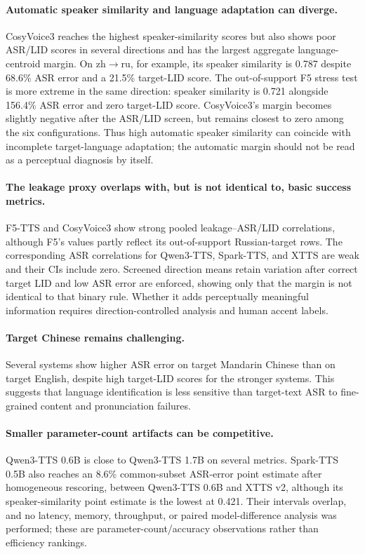 \documentclass[11pt]{article}
\begin{document}
\paragraph{Automatic speaker similarity and language adaptation can diverge.}
CosyVoice3 reaches the highest speaker-similarity scores but also shows poor ASR/LID scores in several directions and has the largest aggregate language-centroid margin. On zh$\rightarrow$ru, for example, its speaker similarity is 0.787 despite 68.6\% ASR error and a 21.5\% target-LID score. The out-of-support F5 stress test is more extreme in the same direction: speaker similarity is 0.721 alongside 156.4\% ASR error and zero target-LID score. CosyVoice3's margin becomes slightly negative after the ASR/LID screen, but remains closest to zero among the six configurations. Thus high automatic speaker similarity can coincide with incomplete target-language adaptation; the automatic margin should not be read as a perceptual diagnosis by itself.

\paragraph{The leakage proxy overlaps with, but is not identical to, basic success metrics.}
F5-TTS and CosyVoice3 show strong pooled leakage--ASR/LID correlations, although F5's values partly reflect its out-of-support Russian-target rows. The corresponding ASR correlations for Qwen3-TTS, Spark-TTS, and XTTS are weak and their CIs include zero. Screened direction means retain variation after correct target LID and low ASR error are enforced, showing only that the margin is not identical to that binary rule. Whether it adds perceptually meaningful information requires direction-controlled analysis and human accent labels.

\paragraph{Target Chinese remains challenging.}
Several systems show higher ASR error on target Mandarin Chinese than on target English, despite high target-LID scores for the stronger systems. This suggests that language identification is less sensitive than target-text ASR to fine-grained content and pronunciation failures.

\paragraph{Smaller parameter-count artifacts can be competitive.}
Qwen3-TTS 0.6B is close to Qwen3-TTS 1.7B on several metrics. Spark-TTS 0.5B also reaches an 8.6\% common-subset ASR-error point estimate after homogeneous rescoring, between Qwen3-TTS 0.6B and XTTS v2, although its speaker-similarity point estimate is the lowest at 0.421. Their intervals overlap, and no latency, memory, throughput, or paired model-difference analysis was performed; these are parameter-count/accuracy observations rather than efficiency rankings.
\end{document}
